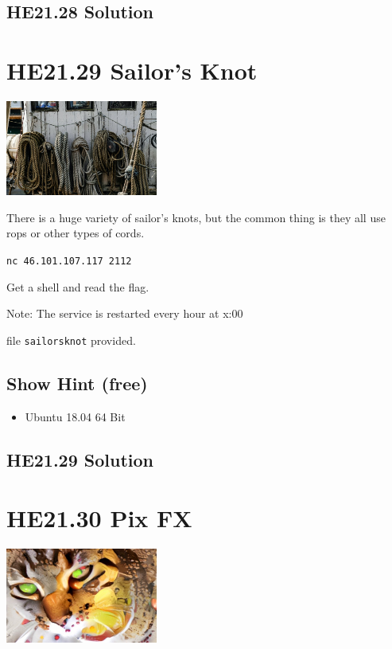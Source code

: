\documentclass[english,a4paper,nols,noindent]{tufte-handout}
\begin{document}
\hypertarget{he21.28-solution}{%
\subsection{HE21.28 Solution}\label{he21.28-solution}}

\noindent 


\hypertarget{he21.29}{%
\section{HE21.29 Sailor's Knot}
  \label{he21.29}}
\begin{marginfigure}
    \includegraphics[width=50mm]{images/challenge29.jpg}
\end{marginfigure}

\noindent There is a huge variety of sailor's knots, but the common thing is they all use rops
or other types of cords.

\verb+nc 46.101.107.117 2112+

Get a shell and read the flag.

Note: The service is restarted every hour at x:00

file \verb+sailorsknot+ provided.

\subsection{Show Hint (free)}
\begin{itemize}
\item Ubuntu 18.04 64 Bit
\end{itemize}

\hypertarget{he21.29-solution}{%
\subsection{HE21.29 Solution}\label{he21.29-solution}}

\noindent 



\hypertarget{he21.30}{%
\section{HE21.30 Pix FX}
  \label{he21.30}}
\begin{marginfigure}
    \includegraphics[width=50mm]{images/challenge30.jpg}
\end{marginfigure}
\end{document}
